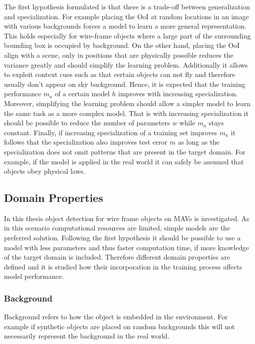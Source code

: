 The first hypothesis formulated is that there is a trade-off between generalization and specialization. For example placing the \ac{OoI} at random locations in an image with various backgrounds forces a model to learn a more general representation. This holds especially for wire-frame objects where a large part of the surrounding bounding box is occupied by background. On the other hand, placing the \ac{OoI} align with a scene, only in positions that are physically possible reduces the variance greatly and should simplify the learning problem. Additionally it allows to exploit context cues such as that certain objects can not fly and therefore usually don't appear on sky background. Hence, it is expected that the training performance $m_{a}$ of a certain model $h$ improves with increasing specialization. Moreover, simplifying the learning problem should allow a simpler model to learn the same task as a more complex model. That is with increasing specialization it should be possible to reduce the number of parameters $w$ while $m_{a}$ stays constant. Finally, if increasing specialization of a training set improves $m_{a}$ it follows that the specialization also improves test error $m$ as long as the specialization does not omit patterns that are present in the target domain. For example, if the model is applied in the real world it can safely be assumed that objects obey physical laws.

\subsection{Domain Properties}

In this thesis object detection for wire frame objects on \acp{MAV} is investigated. As in this scenario computational resources are limited, simple models are the preferred solution. Following the first hypothesis it should be possible to use a model with less parameters and thus faster computation time, if more knowledge of the target domain is included. Therefore different domain properties are defined and it is studied how their incorporation in the training process affects model performance.   

\subsubsection{Background}


	Background refers to how the object is embedded in the environment. For example if synthetic objects are placed on random backgrounds this will not necessarily represent the background in the real world.
	
